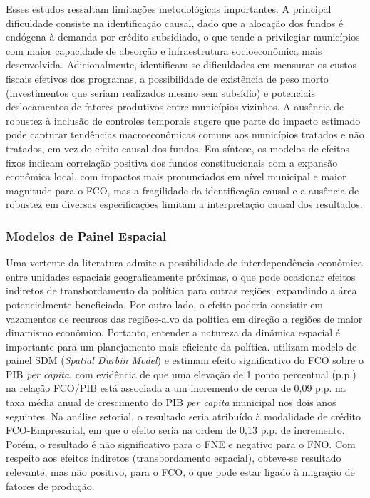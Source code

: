 Esses estudos ressaltam limitações metodológicas importantes. A principal dificuldade consiste na identificação causal, dado que a alocação dos fundos é endógena à demanda por crédito subsidiado, o que tende a privilegiar municípios com maior capacidade de absorção e infraestrutura socioeconômica mais desenvolvida. Adicionalmente, identificam-se dificuldades em mensurar os custos fiscais efetivos dos programas, a possibilidade de existência de peso morto (investimentos que seriam realizados mesmo sem subsídio) e potenciais deslocamentos de fatores produtivos entre municípios vizinhos. A ausência de robustez à inclusão de controles temporais sugere que parte do impacto estimado pode capturar tendências macroeconômicas comuns aos municípios tratados e não tratados, em vez do efeito causal dos fundos. Em síntese, os modelos de efeitos fixos indicam correlação positiva dos fundos constitucionais com a expansão econômica local, com impactos mais pronunciados em nível municipal e maior magnitude para o FCO, mas a fragilidade da identificação causal e a ausência de robustez em diversas especificações limitam a interpretação causal dos resultados.

\subsubsection{Modelos de Painel Espacial}

Uma vertente da literatura admite a possibilidade de interdependência econômica entre unidades espaciais geograficamente próximas, o que pode ocasionar efeitos indiretos de transbordamento da política para outras regiões, expandindo a área potencialmente beneficiada. Por outro lado, o efeito poderia consistir em vazamentos de recursos das regiões-alvo da política em direção a regiões de maior dinamismo econômico. Portanto, entender a natureza da dinâmica espacial é importante para um planejamento mais eficiente da política.  utilizam modelo de painel SDM (\textit{Spatial Durbin Model}) e estimam efeito significativo do FCO sobre o PIB \textit{per capita}, com evidência de que uma elevação de 1 ponto percentual (p.p.) na relação FCO/PIB está associada a um incremento de cerca de 0,09 p.p. na taxa média anual de crescimento do PIB \textit{per capita} municipal nos dois anos seguintes. Na análise setorial, o resultado seria atribuído à modalidade de crédito FCO-Empresarial, em que o efeito seria na ordem de 0,13 p.p. de incremento. Porém, o resultado é não significativo para o FNE e negativo para o FNO. Com respeito aos efeitos indiretos (transbordamento espacial), obteve-se resultado relevante, mas não positivo, para o FCO, o que pode estar ligado à migração de fatores de produção.

